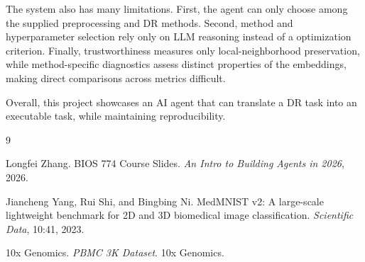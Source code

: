 \documentclass[10pt]{article}
\begin{document}
The system also has many limitations. First, the agent can only choose among the supplied preprocessing and DR methods. Second, method and hyperparameter selection rely only on LLM reasoning instead of a optimization criterion. Finally, trustworthiness measures only local-neighborhood preservation, while method-specific diagnostics assess distinct properties of the embeddings, making direct comparisons across metrics difficult.

Overall, this project showcases an AI agent that can translate a DR task into an executable task, while maintaining reproducibility.

\begin{thebibliography}{9}

    Longfei Zhang.
    BIOS 774 Course Slides.
    \textit{An Intro to Building Agents in 2026},
    2026.

    Jiancheng Yang, Rui Shi, and Bingbing Ni.
    MedMNIST v2: A large-scale lightweight benchmark for 2D and 3D biomedical image classification.
    \textit{Scientific Data}, 10:41, 2023.

    10x Genomics.
    \textit{PBMC 3K Dataset}.
    10x Genomics.

    
    \end{thebibliography}
\end{document}
